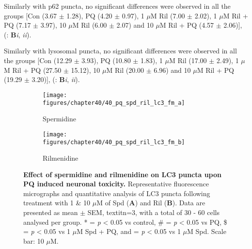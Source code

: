 Similarly with p62 puncta, no significant differences were observed in all the groups [Con (3.67 $\pm$ 1.28), PQ (4.20 $\pm$ 0.97), 1 $\mu$M Ril (7.00 $\pm$ 2.02), 1 $\mu$M Ril + PQ (7.17 $\pm$ 3.97), 10 $\mu$M Ril (6.00 $\pm$ 2.07) and 10 $\mu$M Ril + PQ (4.57 $\pm$ 2.06)], (: \textbf{B}\textit{i}, \textit{ii}).

Similarly with lysosomal puncta, no significant differences were observed in all the groups [Con (12.29 $\pm$ 3.93), PQ (10.80 $\pm$ 1.83), 1 $\mu$M Ril (17.00 $\pm$ 2.49), 1 $\mu$M Ril + PQ (27.50 $\pm$ 15.12), 10 $\mu$M Ril (20.00 $\pm$ 6.96) and 10 $\mu$M Ril + PQ (19.29 $\pm$ 3.20)], (: \textbf{B}\textit{i}, \textit{ii}).

\begin{figure}[!htbp]
  \center
  \begin{subfigure}[b]{0.495\linewidth}
    \texttt{[image: figures/chapter40/40\_pq\_spd\_ril\_lc3\_fm\_a]}
    \caption{Spermidine}
  \end{subfigure}
  \begin{subfigure}[b]{0.495\linewidth}
    \texttt{[image: figures/chapter40/40\_pq\_spd\_ril\_lc3\_fm\_b]}
    \caption{Rilmenidine}
  \end{subfigure}
  \caption[Effect of spermidine and rilmenidine on LC3 puncta upon PQ induced neuronal toxicity]{\textbf{Effect of spermidine and rilmenidine on LC3 puncta upon PQ induced neuronal toxicity.} Representative fluorescence micrographs and quantitative analysis of LC3 puncta following treatment with 1 \& 10 $\mu$M of Spd (\textbf{A}) and Ril (\textbf{B}). Data are presented as mean $\pm$ SEM, textit{n}=3, with a total of 30 - 60 cells analysed per group. * = \textit{p} < 0.05 vs control, \# = \textit{p} < 0.05 vs PQ, \$ = \textit{p} < 0.05 vs 1 $\mu$M Spd + PQ, and \@ = \textit{p} < 0.05 vs 1 $\mu$M Spd. Scale bar: 10 $\mu$M.}
  \label{fig:40_pq_spd_ril_lc3_fm_a}
\end{figure}

